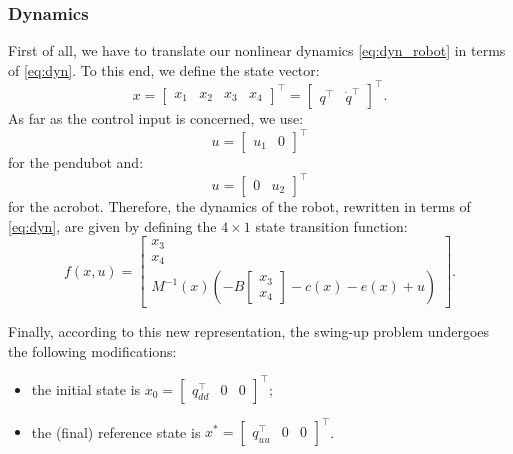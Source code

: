 \subsubsection{Dynamics}
First of all, we have to translate our nonlinear dynamics \ref{eq:dyn_robot} in terms of \ref{eq:dyn}. To this end, we define the state vector: 
\begin{equation*}
    x = \begin{bmatrix} x_1 & x_2 & x_3 & x_4 \end{bmatrix}^\top = \begin{bmatrix} q^\top & \dot{q}^\top \end{bmatrix}^\top.
\end{equation*}
As far as the control input is concerned, we use: 
\begin{equation*}
    u = \begin{bmatrix} u_1 & 0 \end{bmatrix}^\top
\end{equation*}
for the pendubot and: 
\begin{equation*}
    u = \begin{bmatrix} 0 & u_2 \end{bmatrix}^\top
\end{equation*}
for the acrobot. Therefore, the dynamics of the robot, rewritten in terms of \ref{eq:dyn}, are given by defining the $4\times1$ state transition function:
\begin{equation*}
    f(x, u) = \begin{bmatrix} x_3 \\ x_4 \\ M^{-1}(x)\left(-B\begin{bmatrix}x_3 \\ x_4\end{bmatrix} - c(x) - e(x) + u\right) \end{bmatrix}.
\end{equation*}

Finally, according to this new representation, the swing-up problem undergoes the following modifications:
\begin{itemize}
    \item the initial state is $x_0 = \begin{bmatrix} q_{dd}^\top & 0 & 0 \end{bmatrix}^\top$;
    \item the (final) reference state is $x^* = \begin{bmatrix} q_{uu}^\top & 0 & 0 \end{bmatrix}^\top$.
\end{itemize}


